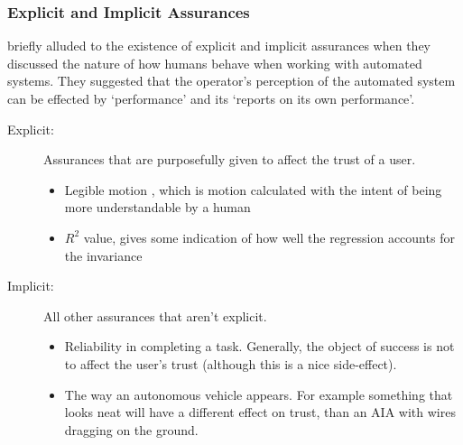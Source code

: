 \subsubsection{Explicit and Implicit Assurances}
\citet{Sheridan1984-kx} briefly alluded to the existence of explicit and implicit assurances when they discussed the nature of how humans behave when working with automated systems. They suggested that the operator's perception of the automated system can be effected by `performance' and its `reports on its own performance'. 


\begin{description}
    \item [Explicit:] Assurances that are purposefully given to affect the trust of a user.
    \begin{itemize}
        \item Legible motion \cite{Dragan2013-wd}, which is motion calculated with the intent of being more understandable by a human
        \item $R^2$ value, gives some indication of how well the regression accounts for the invariance
    \end{itemize}
    \item [Implicit:] All other assurances that aren't explicit.
    \begin{itemize}
        \item Reliability in completing a task. Generally, the object of success is not to affect the user's trust (although this is a nice side-effect).
        \item The way an autonomous vehicle appears. For example something that looks neat will have a different effect on trust, than an AIA with wires dragging on the ground. 
    \end{itemize}
\end{description}


